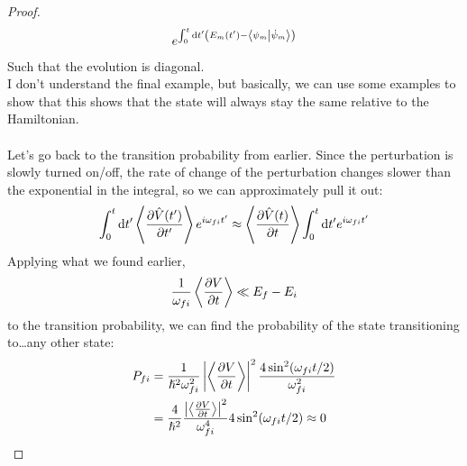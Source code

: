 \documentclass[a4paper]{article}
\begin{document}
\begin{thm}
\begin{proof}
\begin{align*}
		e^{\int_0^t\mathrm{d} t'
			\left(E_m(t')-\left\langle \psi_m\middle\vert \dot{\psi}_m \right\rangle\right)}
	\end{align*}
	Such that the evolution is diagonal.\\
	I don't understand the final example, but basically, we can use
	some examples to show that this shows that the state will always stay
	the same relative to the Hamiltonian.\\~\\
	Let's go back to the transition probability from earlier.
	Since the perturbation is slowly turned on/off, the rate of change of
	the perturbation changes slower than the exponential in the integral,
	so we can approximately pull it out:
	\[
		\int_0^t\mathrm{d} t'\left\langle \frac{\partial \hat{V}(t')}{\partial t'}\right\rangle e^{i\omega_{fi}t'}
		\approx
		\left\langle \frac{\partial \hat{V}(t)}{\partial t}\right\rangle\int_0^t\mathrm{d} t' e^{i\omega_{fi}t'}
	\]
	Applying what we found earlier,
	\[
		\frac{1}{\omega_{fi}}\left\langle \frac{\partial V}{\partial t}\right\rangle \ll E_f-E_i
	\]
	to the transition probability, we can find the probability of the state
	transitioning to\ldots any other state:
	\begin{align*}
		P_{fi} &= \frac{1}{\hslash^2\omega_{fi}^2}
			\left\lvert \left\langle \frac{\partial V}{\partial t}\right\rangle\right\rvert^2
			\frac{4\sin^2(\omega_{fi}t/2)}{\omega_{fi}^2}\\
		&= \frac{4}{\hslash^2}
			\frac{\left\lvert \left\langle \frac{\partial V}{\partial t}\right\rangle\right\rvert^2}{\omega_{fi}^4}
			4\sin^2(\omega_{fi}t/2) \approx 0
	\end{align*}
\end{proof}
\end{thm}
\end{document}
